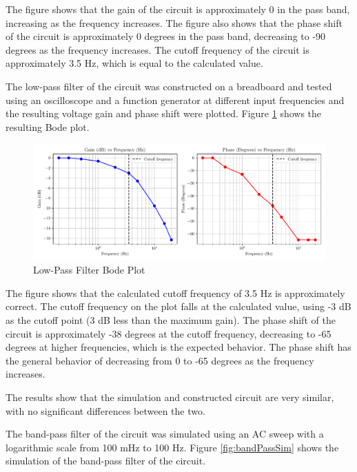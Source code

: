 \documentclass[CMPE]{KGCOEReport}
\begin{document}
The figure shows that the gain of the circuit is approximately 0 in the pass band, increasing as the frequency increases. The figure also shows that the phase shift of the circuit is approximately 0 degrees in the pass band, decreasing to -90 degrees as the frequency increases. The cutoff frequency of the circuit is approximately 3.5 Hz, which is equal to the calculated value.

The low-pass filter of the circuit was constructed on a breadboard and tested using an oscilloscope and a function generator at different input frequencies and the resulting voltage gain and phase shift were plotted. Figure \ref{fig:lowPassBode} shows the resulting Bode plot.

\begin{figure}[H]
    \centering
    \includegraphics[width=1\textwidth]{low_pass_plot.pdf}
    \caption{Low-Pass Filter Bode Plot}
    \label{fig:lowPassBode}
\end{figure}

The figure shows that the calculated cutoff frequency of 3.5 Hz is approximately correct. The cutoff frequency on the plot falls at the calculated value, using -3 dB as the cutoff point (3 dB less than the maximum gain). The phase shift of the circuit is approximately -38 degrees at the cutoff frequency, decreasing to -65 degrees at higher frequencies, which is the expected behavior. The phase shift has the general behavior of decreasing from 0 to -65 degrees as the frequency increases.

The results show that the simulation and constructed circuit are very similar, with no significant differences between the two.

\bigskip

The band-pass filter of the circuit was simulated using an AC sweep with a logarithmic scale from 100 mHz to 100 Hz. Figure \ref{fig:bandPassSim} shows the simulation of the band-pass filter of the circuit.
\end{document}
